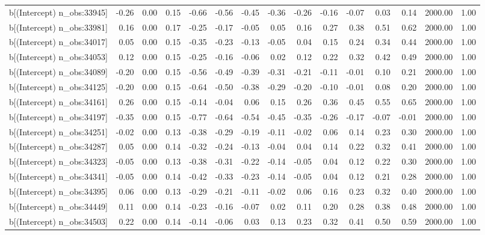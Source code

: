 \begin{table}[ht]
\begin{tabular}{rrrrrrrrrrrrrrr}
  b[(Intercept) n\_obs:33945] & -0.26 & 0.00 & 0.15 & -0.66 & -0.56 & -0.45 & -0.36 & -0.26 & -0.16 & -0.07 & 0.03 & 0.14 & 2000.00 & 1.00 \\ 
  b[(Intercept) n\_obs:33981] & 0.16 & 0.00 & 0.17 & -0.25 & -0.17 & -0.05 & 0.05 & 0.16 & 0.27 & 0.38 & 0.51 & 0.62 & 2000.00 & 1.00 \\ 
  b[(Intercept) n\_obs:34017] & 0.05 & 0.00 & 0.15 & -0.35 & -0.23 & -0.13 & -0.05 & 0.04 & 0.15 & 0.24 & 0.34 & 0.44 & 2000.00 & 1.00 \\ 
  b[(Intercept) n\_obs:34053] & 0.12 & 0.00 & 0.15 & -0.25 & -0.16 & -0.06 & 0.02 & 0.12 & 0.22 & 0.32 & 0.42 & 0.49 & 2000.00 & 1.00 \\ 
  b[(Intercept) n\_obs:34089] & -0.20 & 0.00 & 0.15 & -0.56 & -0.49 & -0.39 & -0.31 & -0.21 & -0.11 & -0.01 & 0.10 & 0.21 & 2000.00 & 1.00 \\ 
  b[(Intercept) n\_obs:34125] & -0.20 & 0.00 & 0.15 & -0.64 & -0.50 & -0.38 & -0.29 & -0.20 & -0.10 & -0.01 & 0.08 & 0.20 & 2000.00 & 1.00 \\ 
  b[(Intercept) n\_obs:34161] & 0.26 & 0.00 & 0.15 & -0.14 & -0.04 & 0.06 & 0.15 & 0.26 & 0.36 & 0.45 & 0.55 & 0.65 & 2000.00 & 1.00 \\ 
  b[(Intercept) n\_obs:34197] & -0.35 & 0.00 & 0.15 & -0.77 & -0.64 & -0.54 & -0.45 & -0.35 & -0.26 & -0.17 & -0.07 & -0.01 & 2000.00 & 1.00 \\ 
  b[(Intercept) n\_obs:34251] & -0.02 & 0.00 & 0.13 & -0.38 & -0.29 & -0.19 & -0.11 & -0.02 & 0.06 & 0.14 & 0.23 & 0.30 & 2000.00 & 1.00 \\ 
  b[(Intercept) n\_obs:34287] & 0.05 & 0.00 & 0.14 & -0.32 & -0.24 & -0.13 & -0.04 & 0.04 & 0.14 & 0.22 & 0.32 & 0.41 & 2000.00 & 1.00 \\ 
  b[(Intercept) n\_obs:34323] & -0.05 & 0.00 & 0.13 & -0.38 & -0.31 & -0.22 & -0.14 & -0.05 & 0.04 & 0.12 & 0.22 & 0.30 & 2000.00 & 1.00 \\ 
  b[(Intercept) n\_obs:34341] & -0.05 & 0.00 & 0.14 & -0.42 & -0.33 & -0.23 & -0.14 & -0.05 & 0.04 & 0.12 & 0.21 & 0.28 & 2000.00 & 1.00 \\ 
  b[(Intercept) n\_obs:34395] & 0.06 & 0.00 & 0.13 & -0.29 & -0.21 & -0.11 & -0.02 & 0.06 & 0.16 & 0.23 & 0.32 & 0.40 & 2000.00 & 1.00 \\ 
  b[(Intercept) n\_obs:34449] & 0.11 & 0.00 & 0.14 & -0.23 & -0.16 & -0.07 & 0.02 & 0.11 & 0.20 & 0.28 & 0.38 & 0.48 & 2000.00 & 1.00 \\ 
  b[(Intercept) n\_obs:34503] & 0.22 & 0.00 & 0.14 & -0.14 & -0.06 & 0.03 & 0.13 & 0.23 & 0.32 & 0.41 & 0.50 & 0.59 & 2000.00 & 1.00 \\ 

\end{tabular}
\end{table}
